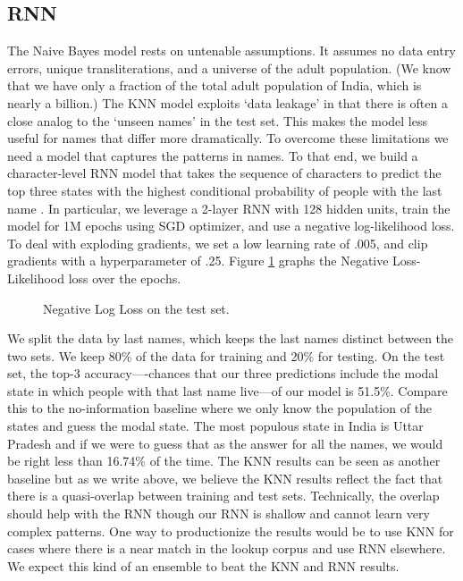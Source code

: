 \documentclass[11pt,  letterpaper]{article}
\begin{document}
\subsection{RNN}

The Naive Bayes model rests on untenable assumptions. It assumes no data entry errors, unique transliterations, and a universe of the adult population. (We know that we have only a fraction of the total adult population of India, which is nearly a billion.) The KNN model exploits `data leakage' in that there is often a close analog to the `unseen names' in the test set. This makes the model less useful for names that differ more dramatically. To overcome these limitations we need a model that captures the patterns in names. To that end, we build a character-level RNN model that takes the sequence of characters to predict the top three states with the highest conditional probability of people with the last name \citep{10.1145/3426826.3426842, 8469258}. In particular, we leverage a 2-layer RNN with 128 hidden units, train the model for 1M epochs using SGD optimizer, and use a negative log-likelihood loss. To deal with exploding gradients, we set a low learning rate of .005, and clip gradients with a hyperparameter of .25. Figure \ref{fig1:test_loss} graphs the Negative Loss-Likelihood loss over the epochs.

\begin{figure}[ht]
  \centering
  \caption{Negative Log Loss on the test set.}
  \label{fig1:test_loss}
\end{figure}

We split the data by last names, which keeps the last names distinct between the two sets. We keep 80\% of the data for training and 20\% for testing. On the test set, the top-3 accuracy—-chances that our three predictions include the modal state in which people with that last name live—of our model is 51.5\%. Compare this to the no-information baseline where we only know the population of the states and guess the modal state. The most populous state in India is Uttar Pradesh and if we were to guess that as the answer for all the names, we would be right less than 16.74\% of the time. The KNN results can be seen as another baseline but as we write above, we believe the KNN results reflect the fact that there is a quasi-overlap between training and test sets. Technically, the overlap should help with the RNN though our RNN is shallow and cannot learn very complex patterns. One way to productionize the results would be to use KNN for cases where there is a near match in the lookup corpus and use RNN elsewhere. We expect this kind of an ensemble to beat the KNN and RNN results.
\end{document}
